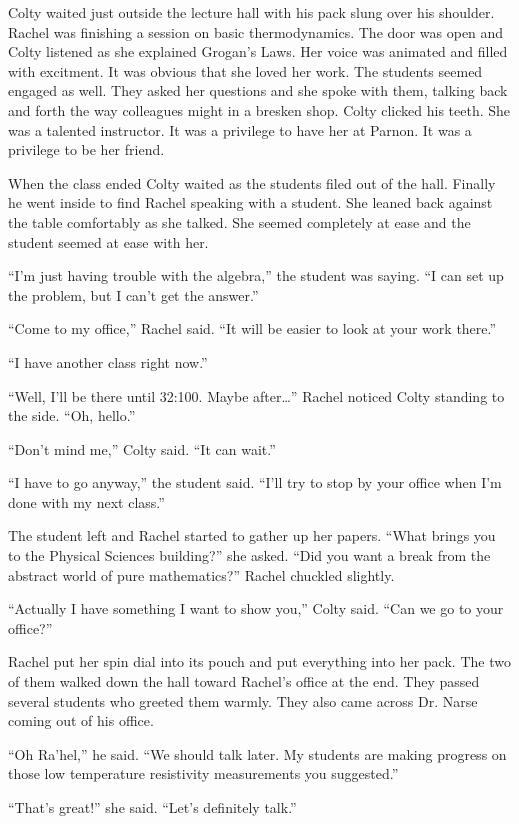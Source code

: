 
Colty waited just outside the lecture hall with his pack slung over his shoulder. Rachel was
finishing a session on basic thermodynamics. The door was open and Colty listened as she
explained Grogan's Laws. Her voice was animated and filled with excitment. It was obvious that
she loved her work. The students seemed engaged as well. They asked her questions and she spoke
with them, talking back and forth the way colleagues might in a bresken shop. Colty clicked his
teeth. She was a talented instructor. It was a privilege to have her at Parnon. It was a
privilege to be her friend.

When the class ended Colty waited as the students filed out of the hall. Finally he went inside
to find Rachel speaking with a student. She leaned back against the table comfortably as she
talked. She seemed completely at ease and the student seemed at ease with her.

``I'm just having trouble with the algebra,'' the student was saying. ``I can set up the
problem, but I can't get the answer.''

``Come to my office,'' Rachel said. ``It will be easier to look at your work there.''

``I have another class right now.''

``Well, I'll be there until 32:100. Maybe after\ldots'' Rachel noticed Colty standing to the
side. ``Oh, hello.''

``Don't mind me,'' Colty said. ``It can wait.''

``I have to go anyway,'' the student said. ``I'll try to stop by your office when I'm done with
my next class.''

The student left and Rachel started to gather up her papers. ``What brings you to the Physical
Sciences building?'' she asked. ``Did you want a break from the abstract world of pure
mathematics?'' Rachel chuckled slightly.

``Actually I have something I want to show you,'' Colty said. ``Can we go to your office?''

Rachel put her spin dial into its pouch and put everything into her pack. The two of them walked
down the hall toward Rachel's office at the end. They passed several students who greeted them
warmly. They also came across Dr. Narse coming out of his office.

``Oh Ra'hel,'' he said. ``We should talk later. My students are making progress on those low
temperature resistivity measurements you suggested.''

``That's great!'' she said. ``Let's definitely talk.''

